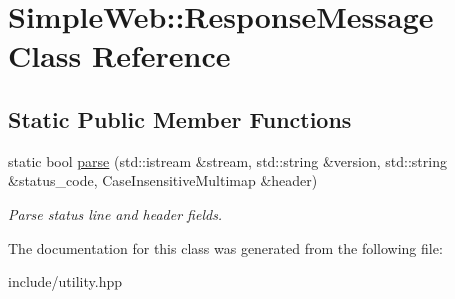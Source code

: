 \hypertarget{classSimpleWeb_1_1ResponseMessage}{}\section{Simple\+Web\+:\+:Response\+Message Class Reference}
\label{classSimpleWeb_1_1ResponseMessage}
\subsection*{Static Public Member Functions}
\begin{DoxyCompactItemize}
\item 
static bool \hyperlink{classSimpleWeb_1_1ResponseMessage_af7c624092e2d88b6300f6bb418de6667}{parse} (std\+::istream \&stream, std\+::string \&version, std\+::string \&status\+\_\+code, Case\+Insensitive\+Multimap \&header)\hypertarget{classSimpleWeb_1_1ResponseMessage_af7c624092e2d88b6300f6bb418de6667}{}\label{classSimpleWeb_1_1ResponseMessage_af7c624092e2d88b6300f6bb418de6667}

\begin{DoxyCompactList}\small\item\em Parse status line and header fields. \end{DoxyCompactList}\end{DoxyCompactItemize}


The documentation for this class was generated from the following file\+:\begin{DoxyCompactItemize}
\item 
include/utility.\+hpp\end{DoxyCompactItemize}

